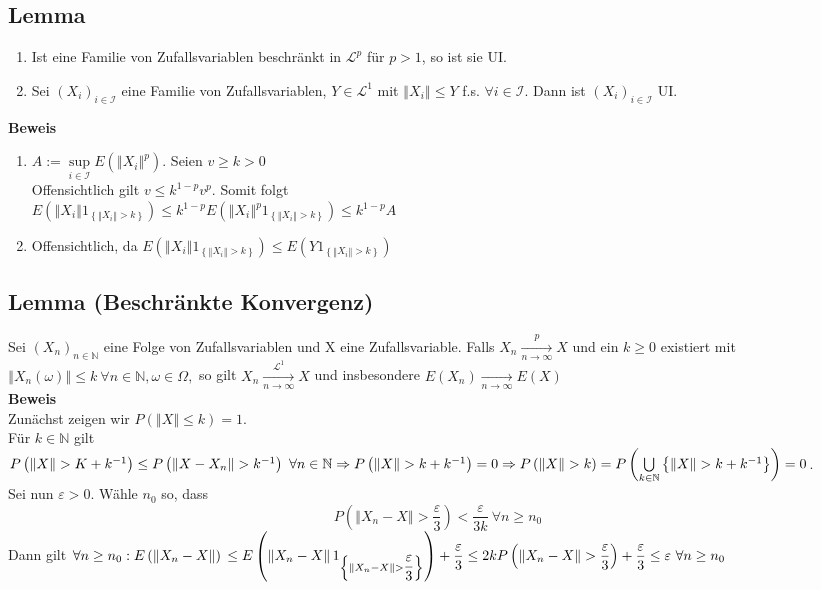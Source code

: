\documentclass[german,10pt,oneside, fleqn, a4paper]{article}
\newcommand {\N}	{\mathbb{N}}
\newcommand{\Ra}	{\Rightarrow}
\newcommand{\brc}[1]{\left(#1\right)}
\newcommand{\brac}[1]{\left\lbrace #1\right\rbrace}
\newcommand{\CUP}[2][\infty]{\bigcup\limits_{#2}^{#1}}
\newcommand{\folge}[3][\N]{\left(#2_#3\right)_{#3\in #1}}
\newcommand{\norm}[1]{\left\Vert #1 \right\Vert}
\newcommand{\mc}[1]{\mathcal{#1}}
\newcommand{\lp}[1]{\mc{L}^{#1}}
\newcommand{\beweis}{\textbf{Beweis}\\}
\newcommand{\1}[1]{1_{#1}}
\newcommand{\2}[1]{\1{\brac{#1}}}
\newcommand{\xnorm}{\norm{X_n-X}}
\begin{document}
\subsection{Lemma}
\begin{enumerate}[label=(\alph*)]
\item Ist eine Familie von Zufallsvariablen beschränkt in $\lp{p}$ für $p>1$, so ist sie UI.
\item Sei $\folge[\mc{I}]{X}{i}$ eine Familie von Zufallsvariablen, $Y\in \lp{1}$ mit $\norm{X_i}\leq Y$ f.s. $\forall i \in\mc{I}$. Dann ist $\folge[\mc{I}]{X}{i}$ UI.\\
\end{enumerate}
\beweis
\begin{enumerate}[label=(\alph*)]
\item $A:=\sup\limits_{i\in\mc{I}}E\brc{\norm{X_i}^p}.$ Seien  $ v \geq  k > 0 $\\ Offensichtlich gilt $v\leq k^{1-p}v^p$. Somit folgt\\ $E\brc{\norm{X_i}1_{\brac{\norm{X_i}>k}}}\leq k^{1-p}E\brc{\norm{X_i}^p1_{\brac{\norm{X_i}>k}}}\leq k^{1-p}A$
\item Offensichtlich, da $E\brc{\norm{X_i}1_{\brac{\norm{X_i}>k}}}\leq E\brc{Y1_{\brac{\norm{X_i}>k}}}$
\end{enumerate}

\subsection{Lemma (Beschränkte Konvergenz)}
\label{2.15}
Sei $\folge{X}{n}$ eine Folge von Zufallsvariablen und X eine Zufallsvariable. Falls $X_n\xrightarrow[n\rightarrow\infty]{p}X$ und ein $k\geq 0$ existiert mit $\norm{X_n(\omega)}\leq k\ \forall n\in\N,\omega\in\Omega,$ so gilt $X_n\xrightarrow[n\rightarrow\infty]{\lp{1}}X$ und insbesondere $E(X_n)\xrightarrow[n\rightarrow\infty]{}E(X)$\\
\beweis
Zunächst zeigen wir $P\brc{\norm{X}\leq k}=1$. \\
Für $k\in\N$ gilt \\
$P\brc{\norm{X}>K+k^{-1}}\leq P\brc{\norm{X-X_n}>k^{-1}}\ \forall n\in\N\\
\Ra P\brc{\norm{X}>k+k^{-1}}=0\\
\Ra P\brc{\norm{X}>k}=P\brc{\CUP[]{k\in\N}\brac{\norm{X}>k+k^{-1}}}=0$.\\
Sei nun $\varepsilon>0$. Wähle $n_0$ so, dass \[P\brc{\norm{X_n-X}>\dfrac{\varepsilon}{3}}<\dfrac{\varepsilon}{3k}\ \forall n\geq n_0\]
Dann gilt $\forall n\geq n_0:\\
E\brc{\norm{X_n-X}}\\\leq E\brc{\norm{X_n-X}\1{\brac{\norm{X_n-X}>\dfrac{\varepsilon}{3}}}}+\dfrac{\varepsilon}{3}\\\leq 2kP\brc{\xnorm>\dfrac{\varepsilon}{3}}+\dfrac{\varepsilon}{3}\leq\varepsilon\ \forall n\geq n_0$
\end{document}
